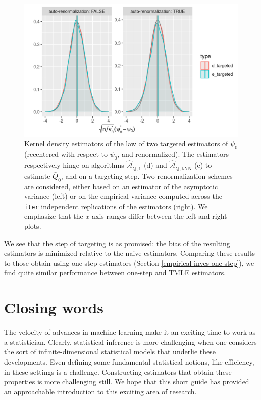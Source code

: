 \documentclass[11pt,openright,twoside]{book}
\newcommand{\Algo}{\widehat{\mathcal{A}}}
\newcommand{\Qbar}{\bar{Q}}
\theoremstyle{definition}
\theoremstyle{definition}
\theoremstyle{definition}
\theoremstyle{remark}
\begin{document}
\begin{figure}

{\centering \includegraphics[width=0.7\linewidth]{img/tmle-1} 

}

\caption{Kernel density estimators of the law of two targeted estimators of \(\psi_{0}\) (recentered with respect to \(\psi_{0}\), and renormalized). The estimators respectively hinge on algorithms \(\Algo_{\Qbar,1}\) (d) and \(\Algo_{\Qbar,\text{kNN}}\) (e) to estimate \(\Qbar_{0}\), and on a targeting step. Two renormalization schemes are considered, either based on an estimator of the asymptotic variance (left) or on the empirical variance computed across the \texttt{iter} independent replications of the estimators (right). We emphasize that the \(x\)-axis ranges differ between the left and right plots.}\label{fig:tmle}
\end{figure}

We see that the step of targeting is as promised: the bias of the resulting
estimators is minimized relative to the naive estimators. Comparing
these results to those obtain using one-step estimators (Section
\ref{empirical-inves-one-step}), we find quite similar performance between
one-step and TMLE estimators.

\hypertarget{closing-words}{%
\chapter{Closing words}\label{closing-words}}

The velocity of advances in machine learning make it an exciting time to work as
a statistician. Clearly, statistical inference is more challenging when one
considers the sort of infinite-dimensional statistical models that underlie
these developments. Even defining some fundamental statistical notions, like
efficiency, in these settings is a challenge. Constructing estimators that
obtain these properties is more challenging still. We hope that this short guide
has provided an approachable introduction to this exciting area of research.
\end{document}
